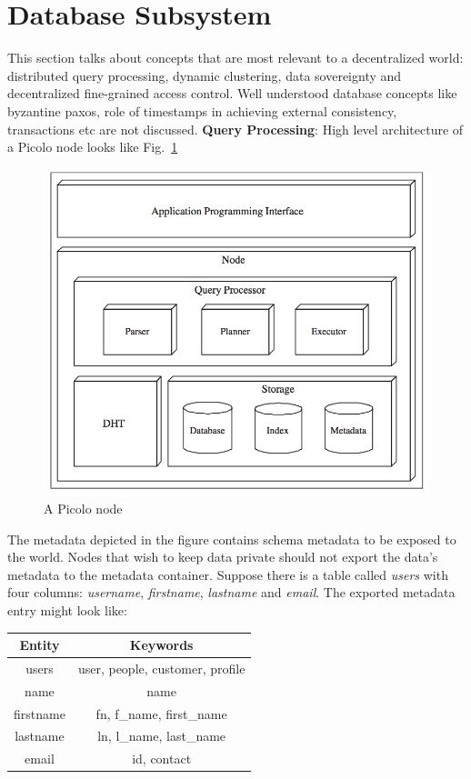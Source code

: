 \documentclass[preprint,12pt]{elsarticle}
\newcommand{\fscale}[1]{#1\linewidth}
\newcommand{\figref}[1]{Fig.~\ref{#1}}
\begin{document}
\section{Database Subsystem}
This section talks about concepts that are most relevant to a decentralized world: distributed query processing, dynamic clustering, data sovereignty and decentralized fine-grained access control. Well understood database concepts like byzantine paxos, role of timestamps in achieving external consistency, transactions etc are not discussed.
\newline
\newline
\textbf{Query Processing}: High level architecture of a Picolo node looks like \figref{fig:node_arch}
\begin{figure}[h!] \centering
	\includegraphics[width=\fscale{1}]{node_arch.png}
	\caption{A Picolo node}
	\label{fig:node_arch}
\end{figure}
The metadata depicted in the figure contains schema metadata to be exposed to the world. Nodes that wish to keep data private should not export the data's metadata to the metadata container. Suppose there is a table called \textit{users} with four columns: \textit{username}, \textit{firstname}, \textit{lastname} and \textit{email}. The exported metadata entry might look like:
\begin{center}
	\begin{tabular}{| c | c |} 
		\hline
		Entity & Keywords \\ [0.5ex] 
		\hline
		users & user, people, customer, profile\\ 
		\hline
		name & name \\
		\hline
		firstname & fn, {f\_name}, {first\_name} \\
		\hline
		lastname & ln, {l\_name}, {last\_name} \\
		\hline
		email & id, contact \\ [1ex] 
		\hline
	\end{tabular}
\end{center}
\end{document}
